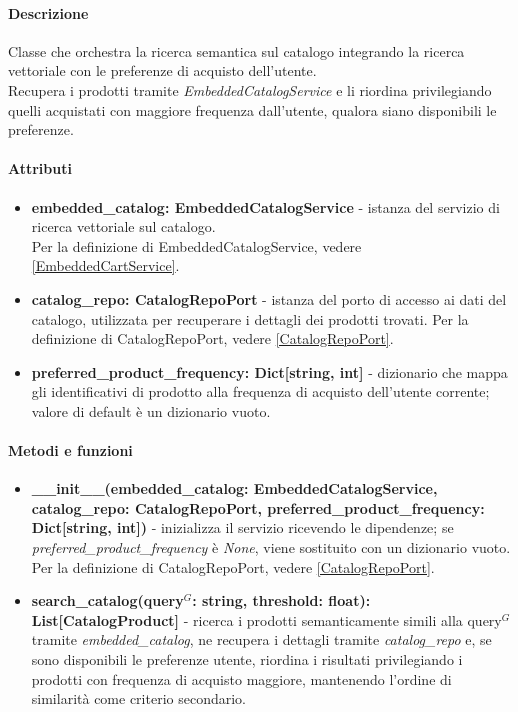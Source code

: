 \paragraph{Descrizione}
Classe che orchestra la ricerca semantica sul catalogo integrando la ricerca
vettoriale con le preferenze di acquisto dell'utente.\\
Recupera i prodotti tramite \textit{EmbeddedCatalogService} e li riordina privilegiando
quelli acquistati con maggiore frequenza dall'utente, qualora siano disponibili le
preferenze.

\paragraph{Attributi}
\begin{itemize}
	\item \textbf{embedded\_catalog: EmbeddedCatalogService} - istanza del servizio di ricerca vettoriale sul catalogo.\\
	Per la definizione di EmbeddedCatalogService, vedere \ref{EmbeddedCartService}.
	\item \textbf{catalog\_repo: CatalogRepoPort} - istanza del porto di accesso ai dati del catalogo, utilizzata per recuperare i dettagli dei prodotti trovati.
	Per la definizione di CatalogRepoPort, vedere \ref{CatalogRepoPort}.
	\item \textbf{preferred\_product\_frequency: Dict[string, int]} - dizionario che
	mappa gli identificativi di prodotto alla frequenza di acquisto dell'utente
	corrente; valore di default è un dizionario vuoto.
\end{itemize}

\paragraph{Metodi e funzioni}
\begin{itemize}
	\item \textbf{\_\_init\_\_(embedded\_catalog: EmbeddedCatalogService, catalog\_repo: CatalogRepoPort, preferred\_product\_frequency: Dict[string, int])} - inizializza il servizio ricevendo le dipendenze; se \textit{preferred\_product\_frequency} è \textit{None}, viene sostituito con un dizionario vuoto.\\
	Per la definizione di CatalogRepoPort, vedere \ref{CatalogRepoPort}.
	\item \textbf{search\_catalog(query$^G$: string, threshold: float): List[CatalogProduct]}
	- ricerca i prodotti semanticamente simili alla query$^G$ tramite
	\textit{embedded\_catalog}, ne recupera i dettagli tramite
	\textit{catalog\_repo} e, se sono disponibili le preferenze utente, riordina i
	risultati privilegiando i prodotti con frequenza di acquisto maggiore, mantenendo
	l'ordine di similarità come criterio secondario.
\end{itemize}

